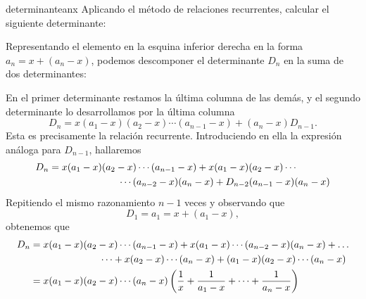 \newpage

\begin{examplebox}{}{determinanteanx}
    Aplicando el método de relaciones recurrentes, calcular el siguiente determinante:
    \begin{matrizn}
    \end{matrizn}

    \tcblower
    \solucion Representando el elemento en la esquina inferior derecha en la forma $a_n = x + (a_n - x)$, podemos descomponer el determinante $D_n$ en la suma de dos determinantes:
    \begin{matrizn}
    \end{matrizn}
    En el primer determinante restamos la última columna de las demás, y el segundo determinante lo desarrollamos por la última columna
    $$D_n = x(a_1 - x)(a_2 - x) \cdots (a_{n-1} - x) + (a_n - x) D_{n-1}.$$
    Esta es precisamente la relación recurrente. Introduciendo en ella la expresión análoga para $D_{n-1}$, hallaremos
    \begin{align*}
        D_n & = x(a_1 - x)(a_2 - x) \cdots (a_{n-1} - x) + x(a_1 - x)(a_2 - x) \cdots \\
        & \hspace{2.5cm} \cdots (a_{n-2} - x)(a_n - x) + D_{n-2}(a_{n-1} - x)(a_n - x)
    \end{align*}
    Repitiendo el mismo razonamiento $n - 1$ veces y observando que
    $$D_1 = a_1 = x + (a_1 - x),$$
    obtenemos que
    \begin{align*}
        D_n & = x(a_1 - x)(a_2 - x) \cdots (a_{n-1} - x) + x(a_1 - x) \cdots (a_{n-2} - x)(a_n - x) + \dots \\
        & \hspace{2.5cm} \cdots + x(a_2 - x) \cdots (a_n - x) + (a_1 - x)(a_2 - x) \cdots (a_n - x) \\
        & = x(a_1 - x)(a_2 - x) \cdots (a_n - x) \left( \frac{1}{x} + \frac{1}{a_1 - x} + \cdots + \frac{1}{a_n - x} \right)
    \end{align*}
\end{examplebox}

